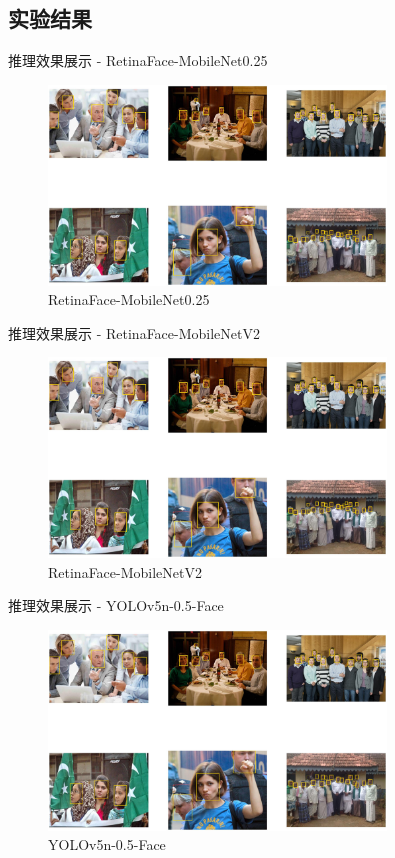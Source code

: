 \documentclass{beamer}
\begin{document}
\subsection{实验结果}
\begin{frame}{推理效果展示 - RetinaFace-MobileNet0.25}
    \begin{figure}
        \centering
        \includegraphics[width=0.8\textwidth]{pic/infer_result/retinaface_mv1_0.25.jpg}
        \caption{RetinaFace-MobileNet0.25}
    \end{figure}
\end{frame}

\begin{frame}{推理效果展示 - RetinaFace-MobileNetV2}
    \begin{figure}
        \centering
        \includegraphics[width=0.8\textwidth]{pic/infer_result/retinaface_mv2.jpg}
        \caption{RetinaFace-MobileNetV2}
    \end{figure}
\end{frame}

\begin{frame}{推理效果展示 - YOLOv5n-0.5-Face}
    \begin{figure}
        \centering
        \includegraphics[width=0.8\textwidth]{pic/infer_result/yolov5n_0.5_face.jpg}
        \caption{YOLOv5n-0.5-Face}
    \end{figure}
\end{frame}
\end{document}

